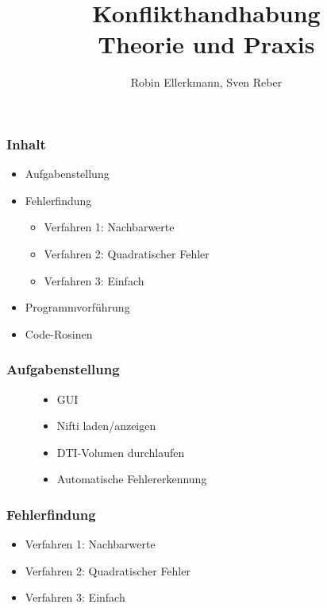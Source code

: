 \documentclass[12pt,a4paper]{beamer}
\author{Robin Ellerkmann, Sven Reber}
\title{Konflikthandhabung\\Theorie und Praxis}
\begin{document}
\maketitle

\begin{frame}
	\frametitle{Inhalt}
	
	\begin{itemize}
		\item Aufgabenstellung
		\item Fehlerfindung
		\begin{itemize}
			\item Verfahren 1: Nachbarwerte
			\item Verfahren 2: Quadratischer Fehler
			\item Verfahren 3: Einfach
		\end{itemize}
		\item Programmvorf\"uhrung
		\item Code-Rosinen
	\end{itemize}
\end{frame}

\begin{frame}
	\frametitle{Aufgabenstellung}
	
	\begin{figure}
		\begin{minipage}{0.45\linewidth}
			\begin{itemize}
				\item GUI
				\item Nifti laden/anzeigen
				\item DTI-Volumen durchlaufen
				\item Automatische Fehlererkennung
			\end{itemize}
		\end{minipage}
	\end{figure}

\end{frame}


\begin{frame}
	\frametitle{Fehlerfindung}
	\begin{itemize}
		\item Verfahren 1: Nachbarwerte
		\item Verfahren 2: Quadratischer Fehler
		\item Verfahren 3: Einfach
	\end{itemize}
\end{frame}
\end{document}
